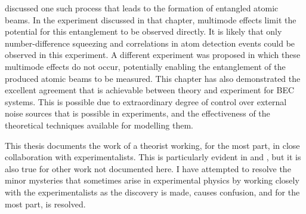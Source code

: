  discussed one such process that leads to the formation of entangled atomic beams.  In the experiment discussed in that chapter, multimode effects limit the potential for this entanglement to be observed directly.  It is likely that only number-difference squeezing and correlations in atom detection events could be observed in this experiment.  A different experiment was proposed in which these multimode effects do not occur, potentially enabling the entanglement of the produced atomic beams to be measured.  This chapter has also demonstrated the excellent agreement that is achievable between theory and experiment for BEC systems.  This is possible due to extraordinary degree of control over external noise sources that is possible in experiments, and the effectiveness of the theoretical techniques available for modelling them.

\parasep

This thesis documents the work of a theorist working, for the most part, in close collaboration with experimentalists.  This is particularly evident in  and , but it is also true for other work not documented here.  I have attempted to resolve the minor mysteries that sometimes arise in experimental physics by working closely with the experimentalists as the discovery is made, causes confusion, and for the most part, is resolved.






